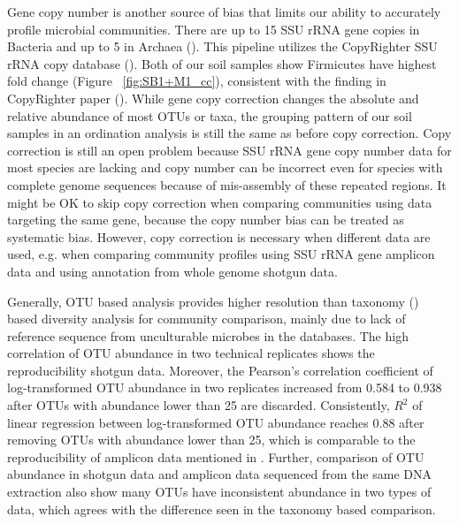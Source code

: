 \documentclass[12pt]{article}
\begin{document}
Gene copy number is another source of bias that limits our ability to
accurately profile microbial communities. There are up to 15 SSU rRNA
gene copies in Bacteria and up to 5 in Archaea
(\cite{rrncopy2004}). This pipeline utilizes the CopyRighter SSU rRNA copy database (\cite{copyrighter}). Both of our soil samples
show Firmicutes have highest fold change (Figure
~\ref{fig:SB1+M1_cc}), consistent with the finding in CopyRighter paper
(\cite{copyrighter}). While gene copy correction changes the
absolute and relative abundance of most OTUs or taxa, the grouping pattern of
our soil samples in an ordination analysis is still the same as before
copy correction. Copy correction is still an open problem because
SSU rRNA gene copy number data for most species are lacking and copy
number can be incorrect even for species with complete genome sequences
because of mis-assembly of these repeated regions. It might be OK to
skip copy correction when comparing communities using data targeting
the same gene, because the copy number bias can be treated as
systematic bias. However, copy correction is necessary when different
data are used, e.g. when comparing community profiles using SSU rRNA gene
amplicon data and using annotation from whole genome shotgun
data.

Generally, OTU based analysis provides higher resolution than taxonomy
(\cite{patotuasse2011}) based diversity analysis for community
comparison, mainly due to lack of reference sequence from unculturable
microbes in the databases. The high correlation of OTU abundance in
two technical replicates shows the reproducibility shotgun
data. Moreover, the Pearson's correlation coefficient of log-transformed
OTU abundance in two replicates increased from 0.584 to 0.938 after
OTUs with abundance lower than 25 are discarded. Consistently, $R^2$
of linear regression between log-transformed OTU abundance reaches
0.88 after removing OTUs with abundance lower than 25, which is
comparable to the reproducibility of amplicon data mentioned
in \cite{arabdopsis}. Further, comparison of OTU abundance in shotgun
data and amplicon data sequenced from the same DNA extraction also
show many OTUs have inconsistent abundance in two types of data, which
agrees with the difference seen in the taxonomy based comparison.
\end{document}

